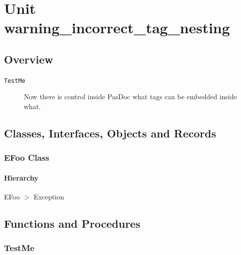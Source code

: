 \documentclass{report}
\newif\ifpdf
\begin{document}
\label{toc}\tableofcontents
\newpage
\newlength{\tmplength}
\chapter{Unit warning{\_}incorrect{\_}tag{\_}nesting}
\label{warning_incorrect_tag_nesting}
\section{Overview}
\begin{description}
\item[\texttt{\begin{ttfamily}EFoo\end{ttfamily} Class}]
\end{description}
\begin{description}
\item[\texttt{TestMe}]Now there is control inside PasDoc what tags can be embedded inside what.
\end{description}
\section{Classes, Interfaces, Objects and Records}
\ifpdf
\subsection*{\large{\textbf{EFoo Class}}\normalsize\hspace{1ex}\hrulefill}
\else
\subsection*{EFoo Class}
\fi
\label{warning_incorrect_tag_nesting.EFoo}
\subsubsection*{\large{\textbf{Hierarchy}}\normalsize\hspace{1ex}\hfill}
EFoo {$>$} Exception
\section{Functions and Procedures}
\ifpdf
\subsection*{\large{\textbf{TestMe}}\normalsize\hspace{1ex}\hrulefill}
\else
\end{document}
